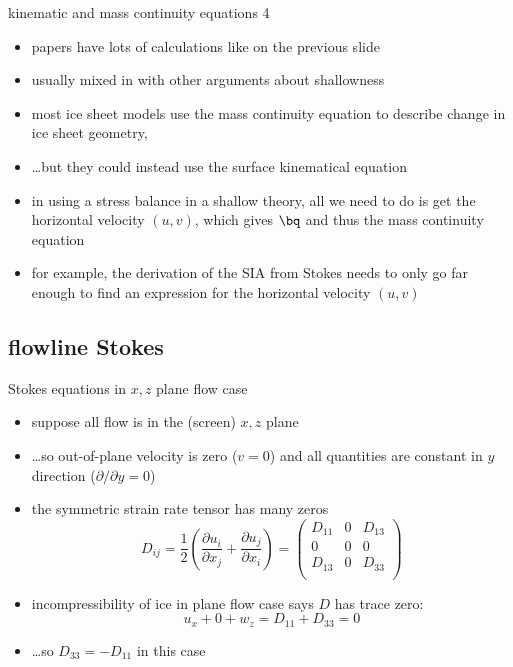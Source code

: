 \begin{frame}{kinematic and mass continuity equations 4}

\begin{itemize}
\item papers have lots of calculations like on the previous slide
\item usually mixed in with other arguments about shallowness
\item most ice sheet models use the mass continuity equation to describe change in ice sheet geometry,
\item \dots but they could instead use the surface kinematical equation
\item in using a stress balance in a shallow theory, all we need to do is get the horizontal velocity $(u,v)$, which gives $\bq$ and thus the mass continuity equation
\item for example, the derivation of the SIA from Stokes needs to only go far enough to find an expression for the horizontal velocity $(u,v)$
\end{itemize}
\end{frame}


\subsection{flowline Stokes}

\begin{frame}{Stokes equations in $x,z$ plane flow case}

\begin{itemize}
\item suppose all flow is in the (screen) $x,z$ plane
\item \dots so out-of-plane velocity is zero ($v=0$) and all quantities are constant in $y$ direction ($\partial/\partial y = 0$)
\item the symmetric strain rate tensor has many zeros
	$$D_{ij} = \frac{1}{2}\left(\frac{\partial u_i}{\partial x_j} + \frac{\partial u_j}{\partial x_i}\right) = \begin{pmatrix}
  	D_{11} & 0 & D_{13} \\
  	0 & 0 & 0 \\
  	D_{13} & 0 & D_{33} \\
  	\end{pmatrix}$$
\item incompressibility of ice in plane flow case says $D$ has trace zero:
	$$u_x + 0 + w_z = D_{11} + D_{33} = 0$$
\item \dots so $D_{33} = - D_{11}$ in this case
\end{itemize}
\end{frame}


